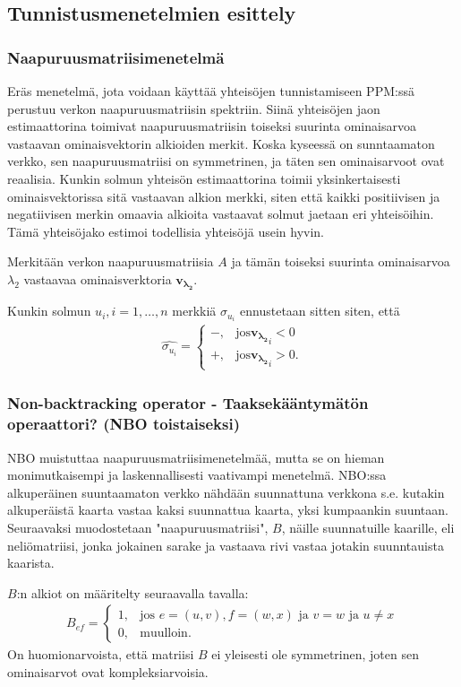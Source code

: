 \documentclass[finnish,12pt,a4paper,pdftex,sci,utf8]{aaltothesis}
\begin{document}
\subsection{Tunnistusmenetelmien esittely}

\subsubsection{Naapuruusmatriisimenetelmä}
Eräs menetelmä, jota voidaan käyttää yhteisöjen tunnistamiseen PPM:ssä perustuu verkon naapuruusmatriisin spektriin. Siinä yhteisöjen jaon estimaattorina toimivat naapuruusmatriisin toiseksi suurinta ominaisarvoa vastaavan ominaisvektorin alkioiden merkit. Koska kyseessä on sunntaamaton verkko, sen naapuruusmatriisi on symmetrinen, ja täten sen ominaisarvoot ovat reaalisia. Kunkin solmun yhteisön estimaattorina toimii yksinkertaisesti ominaisvektorissa sitä vastaavan alkion merkki, siten että kaikki positiivisen ja negatiivisen merkin omaavia alkioita vastaavat solmut jaetaan eri yhteisöihin. Tämä yhteisöjako estimoi todellisia yhteisöjä usein hyvin.

Merkitään verkon naapuruusmatriisia $A$ ja tämän toiseksi suurinta ominaisarvoa $\lambda_2$ vastaavaa ominaisverktoria $\mathbf{v_{\lambda_2}}$.

Kunkin solmun $u_i, i = 1, \ldots, n$ merkkiä $\sigma_{u_i}$ ennustetaan sitten siten, että 
\begin{align*}
	\hat{\sigma_{u_i}} = 
	\begin{cases}
		-, & \text{jos} \mathbf{v_{\lambda_2}}_i < 0 \\
		+, & \text{jos} \mathbf{v_{\lambda_2}}_i > 0.
	\end{cases}
\end{align*}

\subsubsection{Non-backtracking operator - Taaksekääntymätön operaattori? (NBO toistaiseksi)}
NBO muistuttaa naapuruusmatriisimenetelmää, mutta se on hieman monimutkaisempi ja laskennallisesti vaativampi menetelmä. NBO:ssa alkuperäinen suuntaamaton verkko nähdään suunnattuna verkkona s.e. kutakin alkuperäistä kaarta vastaa kaksi suunnattua kaarta, yksi kumpaankin suuntaan. Seuraavaksi muodostetaan "naapuruusmatriisi", $B$, näille suunnatuille kaarille, eli neliömatriisi, jonka jokainen sarake ja vastaava rivi vastaa jotakin suunntauista kaarista. 

$B$:n alkiot on määritelty seuraavalla tavalla:
\begin{align*}
	B_{ef} = 
	\begin{cases}
		1,& \text{jos } e = (u,v), f = (w,x) \text{ ja } v = w \text{ ja } u \neq x \\
		0,& \text{muulloin.}
	\end{cases}
\end{align*}
On huomionarvoista, että matriisi $B$ ei yleisesti ole symmetrinen, joten sen ominaisarvot ovat kompleksiarvoisia.
\end{document}
